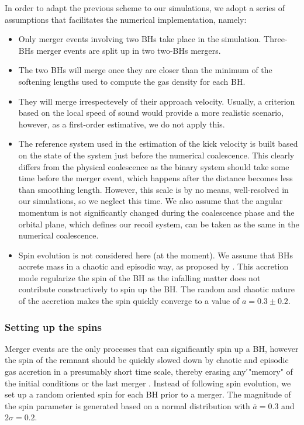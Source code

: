 \documentclass[a4,useAMS,usenatbib,usegraphicx,12pt]{article}
\begin{document}
In order to adapt the previous scheme to our simulations, we adopt a series of assumptions that 
facilitates the numerical implementation, namely:

\begin{itemize}
 \item Only merger events involving two BHs take place in the simulation. Three-BHs merger events
 are split up in two two-BHs mergers.
 \item The two BHs will merge once they are closer than the minimum of the softening lengths used to 
 compute the gas density for each BH.
 \item They will merge irrespectevely of their approach velocity. Usually, a criterion based on the
 local speed of sound would provide a more realistic scenario, however, as a first-order estimative,
 we do not apply this.
 \item The reference system used in the estimation of the kick velocity is built based on the
 state of the system just before the numerical coalescence. This clearly differs from the physical 
 coalescence as the binary system should take some time before the merger event, which happens after 
 the distance becomes less than smoothing length. However, this scale is by no means, well-resolved 
 in our simulations, so we neglect this time. We also assume that the angular momentum is not 
 significantly changed during the coalescence phase and the orbital plane, which defines our recoil 
 system, can be taken as the same in the numerical coalescence.
 \item Spin evolution is not considered here (at the moment). We assume that BHs accrete mass in a 
 chaotic and episodic way, as proposed by \citet{King2008}. This accretion mode regularize the spin
 of the BH as the infalling matter does not contribute constructively to spin up the BH. The random 
 and chaotic nature of the accretion makes the spin quickly converge to a value of $a = 0.3 \pm 0.2$.
\end{itemize}


\subsubsection{Setting up the spins}

Merger events are the only processes that can significantly spin up a BH, however the spin of the 
remnant should be quickly slowed down by chaotic and episodic gas accretion in a presumably short 
time scale, thereby erasing any ́"memory" of the initial conditions or the last merger \citep{King2008}. 
Instead of following spin evolution, we set up a random oriented spin for each BH prior to a merger.
The magnitude of the spin parameter is generated based on a normal distribution with $\bar{a} = 0.3$ 
and $2\sigma = 0.2$.
\end{document}
